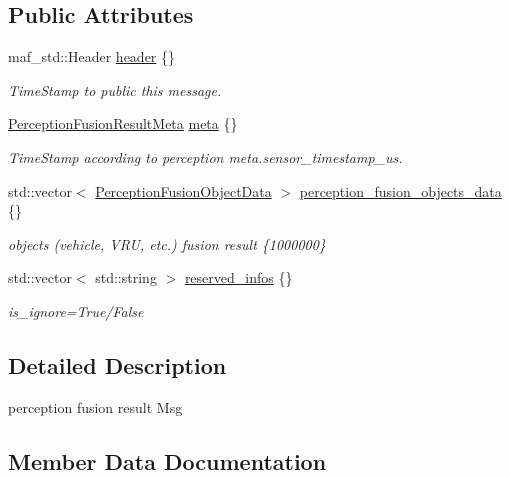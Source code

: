 \subsection*{Public Attributes}
\begin{DoxyCompactItemize}
\item 
maf\+\_\+std\+::\+Header \hyperlink{structmaf__perception__interface_1_1PerceptionFusionObjectResult_a44a9a556308a13ccf12c4b460e1770c0}{header} \{\}
\begin{DoxyCompactList}\small\item\em Time\+Stamp to public this message. \end{DoxyCompactList}\item 
\hyperlink{structmaf__perception__interface_1_1PerceptionFusionResultMeta}{Perception\+Fusion\+Result\+Meta} \hyperlink{structmaf__perception__interface_1_1PerceptionFusionObjectResult_a09b43915c7235da01cee231f6874a0c5}{meta} \{\}
\begin{DoxyCompactList}\small\item\em Time\+Stamp according to perception meta.\+sensor\+\_\+timestamp\+\_\+us. \end{DoxyCompactList}\item 
std\+::vector$<$ \hyperlink{structmaf__perception__interface_1_1PerceptionFusionObjectData}{Perception\+Fusion\+Object\+Data} $>$ \hyperlink{structmaf__perception__interface_1_1PerceptionFusionObjectResult_aed867960e105567704ef6b5b8d074089}{perception\+\_\+fusion\+\_\+objects\+\_\+data} \{\}
\begin{DoxyCompactList}\small\item\em objects (vehicle, V\+RU, etc.) fusion result \{1000000\} \end{DoxyCompactList}\item 
std\+::vector$<$ std\+::string $>$ \hyperlink{structmaf__perception__interface_1_1PerceptionFusionObjectResult_aa973ab4f48c216231d77fe7c9bf8c3bd}{reserved\+\_\+infos} \{\}
\begin{DoxyCompactList}\small\item\em is\+\_\+ignore=True/\+False \end{DoxyCompactList}\end{DoxyCompactItemize}


\subsection{Detailed Description}
perception fusion result Msg 

\subsection{Member Data Documentation}
\mbox{\label{structmaf__perception__interface_1_1PerceptionFusionObjectResult_a44a9a556308a13ccf12c4b460e1770c0}} 
